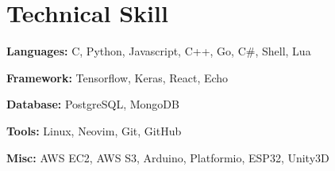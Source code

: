 \section{Technical Skill}
    \begin{onecolentry}
        \textbf{Languages:} C, Python, Javascript, C++, Go, C\#, Shell, Lua
    \end{onecolentry}

    \vspace{0.2 cm}

    \begin{onecolentry}
        \textbf{Framework:} Tensorflow, Keras, React, Echo
    \end{onecolentry}

    \vspace{0.2 cm}

    \begin{onecolentry}
        \textbf{Database:} PostgreSQL, MongoDB
    \end{onecolentry}

    \vspace{0.2 cm}

    \begin{onecolentry}
        \textbf{Tools:} Linux, Neovim, Git, GitHub
    \end{onecolentry}

    \vspace{0.2 cm}

    \begin{onecolentry}
        \textbf{Misc:} AWS EC2, AWS S3, Arduino, Platformio, ESP32, Unity3D
    \end{onecolentry}
